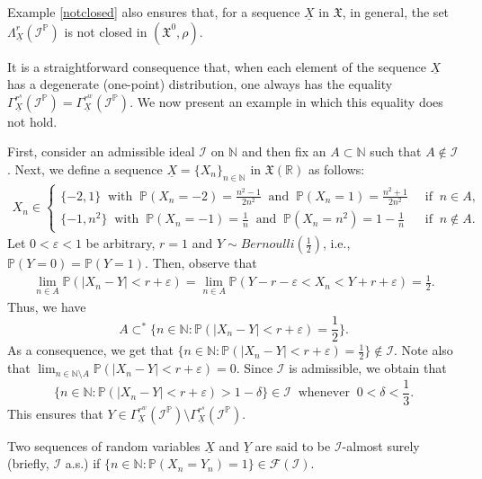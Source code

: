\documentclass[reqno]{amsart}
\begin{document}
\begin{note}
 Example \ref{notclosed} also ensures that, for a sequence $\underline{X}$ in $\mathfrak{X}$, in general, the set $\Lambda^{r}_{\underline{X}}(\mathcal{I}^{\mathbb{P}})$ is not closed in  $(\mathfrak{X^0},\rho)$. 
\end{note}
It is a straightforward consequence that, when each element of the sequence $\underline{X}$ 
has a degenerate (one-point) distribution, one always has the equality $\Gamma^{r^s}_{\underline{X}}(\mathcal{I}^{\mathbb{P}})= \Gamma^{r^w}_{\underline{X}}(\mathcal{I}^{\mathbb{P}})$. We now present an example in which this equality does not hold.
\begin{example}
First, consider an admissible ideal $\mathcal{I}$ on $\mathbb{N}$ and then fix an $A\subset\mathbb{N}$ such that $A\notin\mathcal{I}$. Next, we define a sequence $\underline{X}=\{X_n\}_{n\in\mathbb{N}}$ in $\mathfrak{X}(\mathbb{R})$ as follows:
\begin{align*}
	X_{n}\in
	\begin{cases}
		\{-2,1\}~\mbox{ with }~ \mathbb{P}(X_n=-2)=\frac{n^2-1}{2n^2}~\mbox{ and }~\mathbb{P}(X_n=1)=\frac{n^2+1}{2n^2}~&\mbox{ if }~n\in A, \\
		\{-1,n^2\}~\mbox{ with }~ \mathbb{P}(X_n=-1)=\frac{1}{n}~\mbox{ and }~ \mathbb{P}(X_n=n^2)=1-\frac{1}{n}~&\mbox{ if }~n\notin A.
	\end{cases}
\end{align*}
Let $0<\varepsilon<1$ be arbitrary, $r=1$  and $Y\sim Bernoulli(\frac{1}{2})$, i.e., $\mathbb{P}(Y=0)=\mathbb{P}(Y=1)$. Then,  observe that
\begin{align*}
	\lim_{n\in A}\mathbb{P}(|X_n-Y|<r+\varepsilon)=\lim_{n\in A}\mathbb{P}(Y-r-\varepsilon<X_n<Y+r+\varepsilon)=\frac{1}{2}.
\end{align*}
Thus, we have 
$$
A\subset^*\{n\in\mathbb{N}:\mathbb{P}(|X_n-Y|<r+\varepsilon)=\frac{1}{2}\}.
$$
As a consequence, we get that $\{n\in\mathbb{N}:\mathbb{P}(|X_n-Y|<r+\varepsilon)=\frac{1}{2}\}\notin \mathcal{I}$. Note also that 
$\displaystyle\lim_{n\in\mathbb{N}\setminus A}\mathbb{P}(|X_n-Y|<r+\varepsilon)=0$.
Since $\mathcal{I}$ is admissible, we obtain that 
$$
\{n\in\mathbb{N}:\mathbb{P}(|X_n-Y|<r+\varepsilon)>1-\delta\}\in\mathcal{I}~\mbox{ whenever }~0<\delta<\frac{1}{3}.
$$
 This ensures that $Y\in \Gamma^{r^w}_{\underline{X}}(\mathcal{I}^{\mathbb{P}})\setminus \Gamma^{r^s}_{\underline{X}}(\mathcal{I}^{\mathbb{P}})$. 
\end{example}
\begin{definition}
Two sequences of random variables $\underline{X}$ and $\underline{Y}$ are said to be $\mathcal{I}$-almost surely (briefly, $\mathcal{I}$ a.s.) if $\{n\in\mathbb{N}:\mathbb{P}(X_n=Y_n)=1\}\in \mathcal{F}(\mathcal{I})$.
\end{definition}
\end{document}
